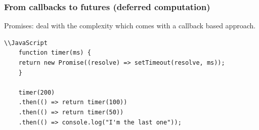 \begin{frame}[fragile]
    \frametitle{From callbacks to futures (deferred computation)}
    Promises: deal with the complexity which comes with a callback based approach.
    \begin{block}{}
        \begin{verbatim}
\\JavaScript         
    function timer(ms) {
    return new Promise((resolve) => setTimeout(resolve, ms));
    }
    
    timer(200)
    .then(() => return timer(100))
    .then(() => return timer(50))
    .then(() => console.log("I'm the last one"));

        \end{verbatim}
    \end{block}
    
\end{frame}
